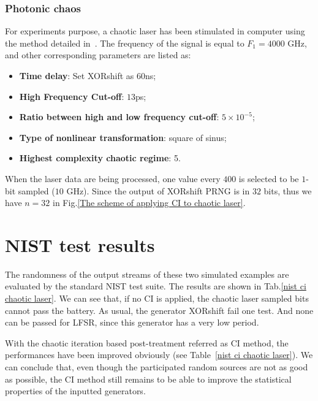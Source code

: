 \subsubsection{Photonic chaos}
For experiments purpose, a chaotic laser has been stimulated in computer using 
the method detailed in~\cite{PhysRevE.79.026208}. The frequency of the signal is
equal to $F_1 = 4000$ GHz, and other corresponding parameters are listed as:
\begin{itemize}
 \item \textbf{Time delay}: Set XORshift as $60$ns;
 \item \textbf{High Frequency Cut-off}: $13$ps;
 \item \textbf{Ratio between high and low frequency cut-off}: $5\times10^{-5}$;
 \item \textbf{Type of nonlinear transformation}: square of sinus;
 \item \textbf{Highest complexity chaotic regime}: 5.
\end{itemize}
When the laser data are being processed, one value every $400$ is selected to be $1$-bit sampled ($10$ GHz). Since the output of XORshift PRNG is in $32$ bits, thus we have $n = 32$
in Fig.\ref{The scheme of applying CI to chaotic laser}.

\section{NIST test results}
The randomness of the output streams of these two simulated examples are evaluated by 
the standard NIST test suite. The results are shown in Tab.\ref{nist ci chaotic laser}. 
We can see that, if no CI is applied,  the chaotic laser sampled 
bits cannot pass the battery. As usual, the generator XORshift fail one test. 
And none can be passed for LFSR, since this generator has a very low period. 

With the chaotic iteration based post-treatment referred as CI method, the performances 
 have been improved obviously (see Table~\ref{nist ci chaotic laser}). 
We can conclude that, even though the participated random sources are not as good as possible, the CI method still remains to be able to improve the statistical properties of the inputted 
generators.


